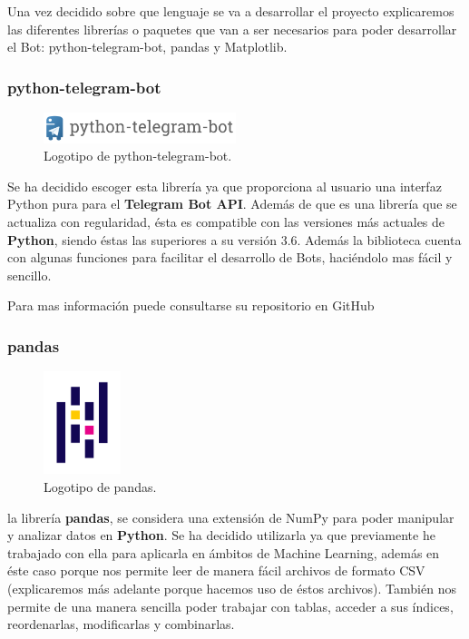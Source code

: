 Una vez decidido sobre que lenguaje se va a desarrollar el proyecto explicaremos las diferentes librerías o paquetes que van a ser necesarios para poder desarrollar el Bot: python-telegram-bot, pandas y Matplotlib.

\subsubsection{python-telegram-bot}

\begin{figure}[H]
	\centering
	\includegraphics[width=0.5\textwidth]{img/python-telegram-bot-icon}
	\caption{Logotipo de python-telegram-bot.}
\end{figure}

Se ha decidido escoger esta librería ya que proporciona al usuario una interfaz Python pura para el \textbf{Telegram Bot API}. Además de que es una librería que se actualiza con regularidad, ésta es compatible con las versiones más actuales de \textbf{Python}, siendo éstas las superiores a su versión 3.6. Además la biblioteca cuenta con algunas funciones para facilitar el desarrollo de Bots, haciéndolo mas fácil y sencillo.

Para mas información puede consultarse su repositorio en GitHub \cite{python-telegram-bot}

\subsubsection{pandas}

\begin{figure}[H]
	\centering
	\includegraphics[width=0.2\textwidth]{img/pandas-icon}
	\caption{Logotipo de pandas.}
\end{figure}

la librería \textbf{pandas}, se considera una extensión de NumPy para poder manipular y analizar datos en \textbf{Python}. Se ha decidido utilizarla ya que previamente he trabajado con ella para aplicarla en ámbitos de Machine Learning, además en éste caso porque nos permite leer de manera fácil archivos de formato CSV (explicaremos más adelante porque hacemos uso de éstos archivos). También nos permite de una manera sencilla poder trabajar con tablas, acceder a sus índices, reordenarlas, modificarlas y combinarlas.

